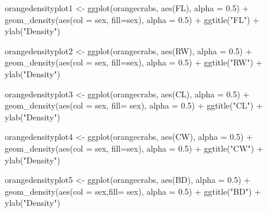 \documentclass[
]{article}
\newenvironment{Shaded}{}{}
\newcommand{\AttributeTok}[1]{#1}
\newcommand{\FloatTok}[1]{#1}
\newcommand{\FunctionTok}[1]{#1}
\newcommand{\NormalTok}[1]{#1}
\newcommand{\OtherTok}[1]{\textcolor[rgb]{1.00,0.25,0.00}{#1}}
\newcommand{\SpecialCharTok}[1]{\textcolor[rgb]{0.00,0.50,0.50}{#1}}
\newcommand{\StringTok}[1]{\textcolor[rgb]{0.00,0.50,0.50}{#1}}
\begin{document}
\begin{Shaded}
\begin{Highlighting}[]
\NormalTok{orangedensityplot1 }\OtherTok{\textless{}{-}} \FunctionTok{ggplot}\NormalTok{(orangecrabs, }\FunctionTok{aes}\NormalTok{(FL), }\AttributeTok{alpha =} \FloatTok{0.5}\NormalTok{) }\SpecialCharTok{+}
  \FunctionTok{geom\_density}\NormalTok{(}\FunctionTok{aes}\NormalTok{(}\AttributeTok{col =}\NormalTok{ sex, }\AttributeTok{fill=}\NormalTok{sex), }\AttributeTok{alpha =} \FloatTok{0.5}\NormalTok{) }\SpecialCharTok{+}
\FunctionTok{ggtitle}\NormalTok{(}\StringTok{"FL"}\NormalTok{) }\SpecialCharTok{+} \FunctionTok{ylab}\NormalTok{(}\StringTok{"Density"}\NormalTok{)}

\NormalTok{orangedensityplot2 }\OtherTok{\textless{}{-}} \FunctionTok{ggplot}\NormalTok{(orangecrabs, }\FunctionTok{aes}\NormalTok{(RW), }\AttributeTok{alpha =} \FloatTok{0.5}\NormalTok{) }\SpecialCharTok{+}
  \FunctionTok{geom\_density}\NormalTok{(}\FunctionTok{aes}\NormalTok{(}\AttributeTok{col =}\NormalTok{ sex, }\AttributeTok{fill=}\NormalTok{sex), }\AttributeTok{alpha =} \FloatTok{0.5}\NormalTok{) }\SpecialCharTok{+}
\FunctionTok{ggtitle}\NormalTok{(}\StringTok{"RW"}\NormalTok{) }\SpecialCharTok{+} \FunctionTok{ylab}\NormalTok{(}\StringTok{"Density"}\NormalTok{)}

\NormalTok{orangedensityplot3 }\OtherTok{\textless{}{-}} \FunctionTok{ggplot}\NormalTok{(orangecrabs, }\FunctionTok{aes}\NormalTok{(CL), }\AttributeTok{alpha =} \FloatTok{0.5}\NormalTok{) }\SpecialCharTok{+}
  \FunctionTok{geom\_density}\NormalTok{(}\FunctionTok{aes}\NormalTok{(}\AttributeTok{col =}\NormalTok{ sex, }\AttributeTok{fill=}\NormalTok{ sex), }\AttributeTok{alpha =} \FloatTok{0.5}\NormalTok{) }\SpecialCharTok{+}
\FunctionTok{ggtitle}\NormalTok{(}\StringTok{"CL"}\NormalTok{) }\SpecialCharTok{+} \FunctionTok{ylab}\NormalTok{(}\StringTok{"Density"}\NormalTok{)}

\NormalTok{orangedensityplot4 }\OtherTok{\textless{}{-}} \FunctionTok{ggplot}\NormalTok{(orangecrabs, }\FunctionTok{aes}\NormalTok{(CW), }\AttributeTok{alpha =} \FloatTok{0.5}\NormalTok{) }\SpecialCharTok{+}
  \FunctionTok{geom\_density}\NormalTok{(}\FunctionTok{aes}\NormalTok{(}\AttributeTok{col =}\NormalTok{ sex, }\AttributeTok{fill=}\NormalTok{sex), }\AttributeTok{alpha =} \FloatTok{0.5}\NormalTok{) }\SpecialCharTok{+}
\FunctionTok{ggtitle}\NormalTok{(}\StringTok{"CW"}\NormalTok{) }\SpecialCharTok{+} \FunctionTok{ylab}\NormalTok{(}\StringTok{"Density"}\NormalTok{)}

\NormalTok{orangedensityplot5 }\OtherTok{\textless{}{-}} \FunctionTok{ggplot}\NormalTok{(orangecrabs, }\FunctionTok{aes}\NormalTok{(BD), }\AttributeTok{alpha =} \FloatTok{0.5}\NormalTok{) }\SpecialCharTok{+}
  \FunctionTok{geom\_density}\NormalTok{(}\FunctionTok{aes}\NormalTok{(}\AttributeTok{col =}\NormalTok{ sex,}\AttributeTok{fill=}\NormalTok{ sex), }\AttributeTok{alpha =} \FloatTok{0.5}\NormalTok{) }\SpecialCharTok{+}
\FunctionTok{ggtitle}\NormalTok{(}\StringTok{"BD"}\NormalTok{) }\SpecialCharTok{+} \FunctionTok{ylab}\NormalTok{(}\StringTok{"Density"}\NormalTok{)}


\end{Highlighting}
\end{Shaded}
\end{document}
